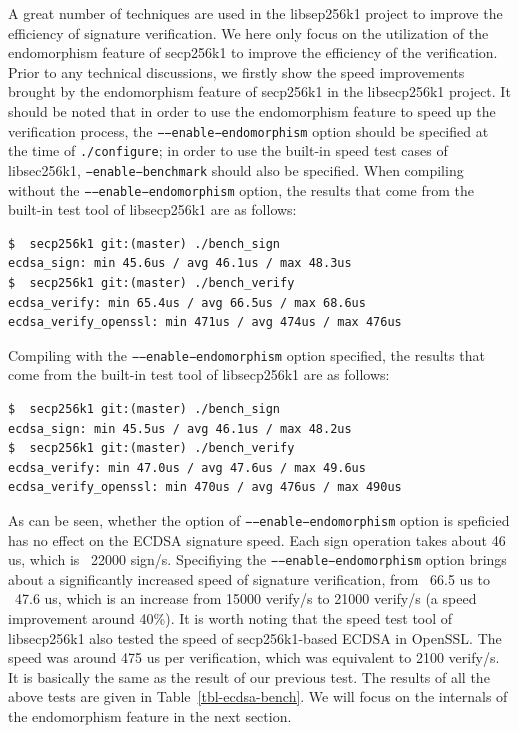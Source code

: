 \documentclass{article}
\newcommand{\code}[1]{\lstinline!#1!}
\begin{document}
A great number of techniques are used in the libsep256k1 project to improve the efficiency of signature verification. 
We here only focus on the utilization of the endomorphism feature of secp256k1 to improve the efficiency of the verification. 
Prior to any technical discussions, we firstly show the speed improvements brought  by 
the endomorphism feature of secp256k1 in the libsecp256k1 project. 
It should be noted that in order to use the endomorphism feature to speed up the verification process, 
the \code{−−enable−endomorphism} option should be specified at the time of \code{./configure}; 
in order to use the built-in speed test cases of libsec256k1, \code{−enable−benchmark} should also be specified. 
When compiling without the  \code{−−enable−endomorphism} option, 
the results that come from the built-in test tool of libsecp256k1 are as follows:

\begin{lstlisting}[caption=\texttt{libsecp256k1 benchmark without --enable-endomorphism}]
$  secp256k1 git:(master) ./bench_sign
ecdsa_sign: min 45.6us / avg 46.1us / max 48.3us
$  secp256k1 git:(master) ./bench_verify 
ecdsa_verify: min 65.4us / avg 66.5us / max 68.6us
ecdsa_verify_openssl: min 471us / avg 474us / max 476us
\end{lstlisting}

Compiling with the \code{−−enable−endomorphism} option specified, 
the results that come from the built-in test tool of libsecp256k1 are as follows:

\begin{lstlisting}[caption=\texttt{libsecp256k1 benchmark with --enable-endomorphism}]
$  secp256k1 git:(master) ./bench_sign  
ecdsa_sign: min 45.5us / avg 46.1us / max 48.2us
$  secp256k1 git:(master) ./bench_verify 
ecdsa_verify: min 47.0us / avg 47.6us / max 49.6us
ecdsa_verify_openssl: min 470us / avg 476us / max 490us
\end{lstlisting}

As can be seen, whether the option of  \code{−−enable−endomorphism} option is speficied has no effect on the ECDSA signature speed. 
Each sign operation takes about 46 us, which is ~22000 sign/s. 
Specifiying the  \code{−−enable−endomorphism} option brings about a significantly increased speed of signature verification, 
from ~66.5 us to ~47.6 us, which is an increase from 15000 verify/s to 21000 verify/s (a speed improvement around 40\%). 
It is worth noting that the speed test tool of libsecp256k1 also tested the speed of secp256k1-based ECDSA in OpenSSL. 
The speed was around 475 us per verification, which was equivalent to 2100 verify/s. 
It is basically the same as the result of our previous test.  The results of all the above tests are given in Table~\ref{tbl-ecdsa-bench}. 
We will focus on the internals of the endomorphism feature in the next section.
\end{document}
